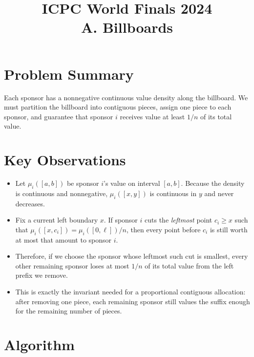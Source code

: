 \documentclass[11pt]{article}
\title{ICPC World Finals 2024\\A. Billboards}
\author{}
\date{}
\begin{document}
\maketitle

\section*{Problem Summary}

Each sponsor has a nonnegative continuous value density along the billboard. We must partition the
billboard into contiguous pieces, assign one piece to each sponsor, and guarantee that sponsor $i$
receives value at least $1/n$ of its total value.

\section*{Key Observations}

\begin{itemize}[leftmargin=*]
    \item Let $\mu_i([a,b])$ be sponsor $i$'s value on interval $[a,b]$. Because the density is continuous
    and nonnegative, $\mu_i([x,y])$ is continuous in $y$ and never decreases.
    \item Fix a current left boundary $x$. If sponsor $i$ cuts the \emph{leftmost} point $c_i \ge x$ such
    that $\mu_i([x,c_i]) = \mu_i([0,\ell])/n$, then every point before $c_i$ is still worth at most that
    amount to sponsor $i$.
    \item Therefore, if we choose the sponsor whose leftmost such cut is smallest, every other remaining
    sponsor loses at most $1/n$ of its total value from the left prefix we remove.
    \item This is exactly the invariant needed for a proportional contiguous allocation: after removing one
    piece, each remaining sponsor still values the suffix enough for the remaining number of pieces.
\end{itemize}

\section*{Algorithm}
\end{document}
